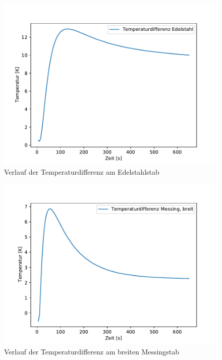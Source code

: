 \begin{figure}[!htbp]
  \centering
  \includegraphics{differenz_edel.pdf}
  \caption{Verlauf der Temperaturdifferenz am Edelstahlstab}
  \label{fig:diff_edel}
\end{figure}

\begin{figure}[!htbp]
  \centering
  \includegraphics{differenz_mess.pdf}
  \caption{Verlauf der Temperaturdifferenz am breiten Messingstab}
  \label{fig:diff_mess}
\end{figure}

